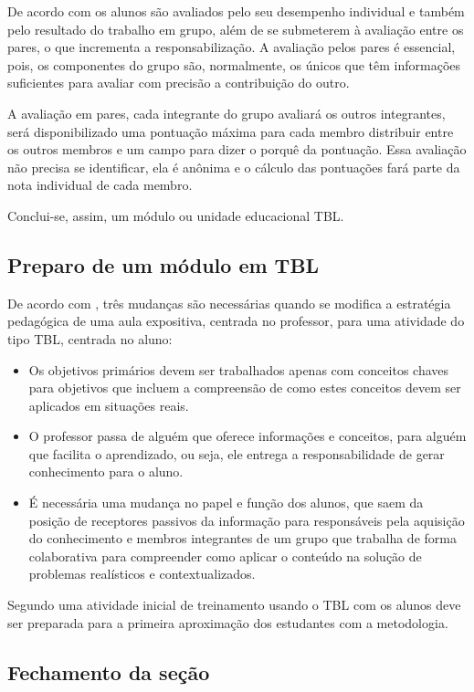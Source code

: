De acordo com \cite{bollela} os alunos são avaliados pelo seu desempenho individual e também pelo resultado do trabalho em grupo, além de se submeterem à avaliação entre os pares, o que incrementa a responsabilização. A avaliação pelos pares é essencial, pois, os componentes do grupo são, normalmente, os únicos que têm informações suficientes para avaliar com precisão a contribuição do outro.

A avaliação em pares, cada integrante do grupo avaliará os outros integrantes, será disponibilizado uma pontuação máxima para cada membro distribuir entre os outros membros e um campo para dizer o porquê da pontuação. Essa avaliação não precisa se identificar, ela é anônima e o cálculo das pontuações fará parte da nota individual de cada membro.

Conclui-se, assim, um módulo ou unidade educacional TBL.

\subsection{Preparo de um módulo em TBL}

De acordo com \cite{bollela}, três mudanças são necessárias quando se modifica a estratégia pedagógica de uma aula expositiva, centrada no professor, para uma atividade do tipo TBL, centrada no aluno:

\begin{itemize}
  \item Os objetivos primários devem ser trabalhados apenas com conceitos chaves para objetivos que incluem a compreensão de como estes conceitos devem ser aplicados em situações reais.
  \item O professor passa de alguém que oferece informações e conceitos, para alguém que facilita o aprendizado, ou seja, ele entrega a responsabilidade de gerar conhecimento para o aluno.
  \item É necessária uma mudança no papel e função dos alunos, que saem da posição de receptores passivos da informação para responsáveis pela aquisição do conhecimento e membros integrantes de um grupo que trabalha de forma colaborativa para compreender como aplicar o conteúdo na solução de problemas realísticos e contextualizados.
\end{itemize}

Segundo \cite{bollela} uma atividade inicial de treinamento usando o TBL com os alunos deve ser preparada para a primeira aproximação dos estudantes com a metodologia.

\subsection{Fechamento da seção}

